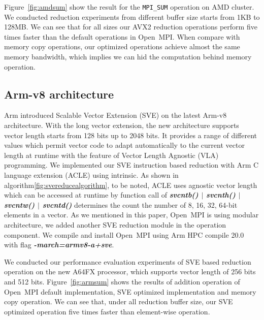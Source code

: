 \documentclass[5p,times,twocolumn]{elsarticle}
\newcommand{\mpifunc}[1]{\lstinline"MPI_#1"\xspace}
\newcommand{\ompi}[0]{Open~MPI\xspace}
\begin{document}
Figure~\ref{fig:amdsum} show the result for the
\mpifunc{SUM} operation on AMD cluster. We conducted reduction experiments from
different buffer size starts from 1KB to 128MB. We can see that for all sizes
our AVX2 reduction operations perform five times faster than the default operations
in \ompi. When compare with memory copy operations, our optimized operations achieve
almost the same memory bandwidth, which implies we can hid the computation behind memory
operation.

\subsection{Arm-v8 architecture}
Arm introduced Scalable Vector Extension (SVE) on the latest Arm-v8 architecture.
With the long vector extension, the new architecture supports vector length starts
from 128 bits up to 2048 bits. It provides a range of different
values which permit vector code to adapt automatically to the
current vector length at runtime with the feature of Vector
Length Agnostic (VLA) programming. We implemented our SVE instruction based reduction with Arm
C language extension (ACLE) using intrinsic. As shown in algorithm\ref{fig:svereducealgorithm},
to be noted, ACLE uses agnostic vector length which can be accessed at runtime by
function call of \emph{\textbf{\textit{svcntb() $\mid$ svcnth() $\mid$ svcntw() $\mid$ svcntd()}}}
determines the count the number of 8, 16, 32, 64-bit elements in a vector.
As we mentioned in this paper, \ompi is using modular architecture,
we added another SVE reduction module in the operation component. We compile
and install \ompi using Arm HPC compile 20.0 with
flag \emph{\textbf{\textit{-march=armv8-a+sve}}}.

We conducted our performance evaluation experiments of SVE based reduction operation on
the new A64FX processor, which supports vector length of 256 bits and 512 bits.
Figure~\ref{fig:armsum} shows the results of addition operation of \ompi default implementation,
SVE optimized implementation and memory copy operation. We can see that, under all reduction
buffer size, our SVE optimized operation five times faster than element-wise operation.
\end{document}
